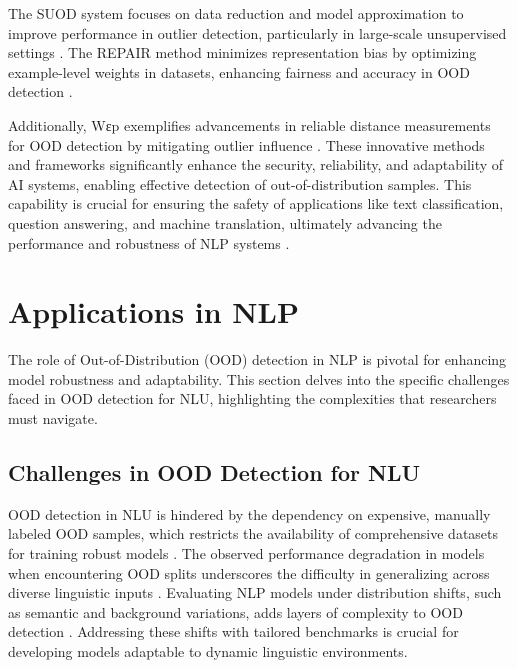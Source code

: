 The SUOD system focuses on data reduction and model approximation to improve performance in outlier detection, particularly in large-scale unsupervised settings \cite{zhao2021suodacceleratinglargescaleunsupervised}. The REPAIR method minimizes representation bias by optimizing example-level weights in datasets, enhancing fairness and accuracy in OOD detection \cite{li2019repairremovingrepresentationbias}.

Additionally, Wεp exemplifies advancements in reliable distance measurements for OOD detection by mitigating outlier influence \cite{nietert2023outlierrobustoptimaltransportduality}. These innovative methods and frameworks significantly enhance the security, reliability, and adaptability of AI systems, enabling effective detection of out-of-distribution samples. This capability is crucial for ensuring the safety of applications like text classification, question answering, and machine translation, ultimately advancing the performance and robustness of NLP systems \cite{lang2023survey,Delvingint2}.











\section{Applications in NLP} \label{sec:Applications in NLP}

The role of Out-of-Distribution (OOD) detection in NLP is pivotal for enhancing model robustness and adaptability. This section delves into the specific challenges faced in OOD detection for NLU, highlighting the complexities that researchers must navigate.

\subsection{Challenges in OOD Detection for NLU} \label{subsec:Challenges in OOD Detection for NLU}

OOD detection in NLU is hindered by the dependency on expensive, manually labeled OOD samples, which restricts the availability of comprehensive datasets for training robust models \cite{Out-of-dom4}. The observed performance degradation in models when encountering OOD splits underscores the difficulty in generalizing across diverse linguistic inputs \cite{porjazovski2024outofdistributiongeneralisationspokenlanguage}. Evaluating NLP models under distribution shifts, such as semantic and background variations, adds layers of complexity to OOD detection \cite{yuan2023revisiting}. Addressing these shifts with tailored benchmarks is crucial for developing models adaptable to dynamic linguistic environments.


